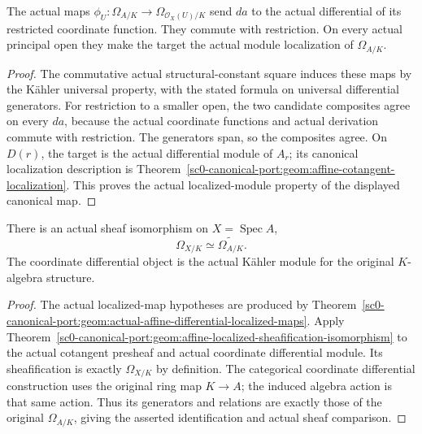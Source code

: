 \begin{theorem}
\label{sc0-canonical-port:geom:actual-affine-differential-localized-maps}
\leanok
The actual maps
\(\phi_U:\Omega_{A/K}\to\Omega_{\mathcal O_X(U)/K}\)
send \(da\) to the actual differential of its restricted
coordinate function. They commute with restriction.
On every actual principal open they make the target
the actual module localization of \(\Omega_{A/K}\).
\end{theorem}
\begin{proof}
The commutative actual structural-constant square induces
these maps by the Kähler universal property, with the
stated formula on universal differential generators.
For restriction to a smaller open, the two candidate
composites agree on every \(da\), because the actual
coordinate functions and actual derivation commute
with restriction. The generators span, so the composites
agree. On \(D(r)\), the target is the actual
differential module of \(A_r\); its canonical
localization description is
Theorem~\ref{sc0-canonical-port:geom:affine-cotangent-localization}.
This proves the actual localized-module property
of the displayed canonical map.
\end{proof}

\begin{theorem}
\label{sc0-canonical-port:geom:actual-affine-cotangent-sheaf-comparison}
\leanok
There is an actual sheaf isomorphism on
\(X=\operatorname{Spec}A\),
\[
 \Omega_{X/K}\simeq\widetilde{\Omega_{A/K}}.
\]
The coordinate differential object is the actual
Kähler module for the original \(K\)-algebra structure.
\end{theorem}
\begin{proof}
The actual localized-map hypotheses are produced by
Theorem~\ref{sc0-canonical-port:geom:actual-affine-differential-localized-maps}.
Apply Theorem~\ref{sc0-canonical-port:geom:affine-localized-sheafification-isomorphism}
to the actual cotangent presheaf and actual coordinate
differential module. Its sheafification is exactly
\(\Omega_{X/K}\) by definition. The categorical
coordinate differential construction uses the original
ring map \(K\to A\); the induced algebra action is
that same action. Thus its generators and relations
are exactly those of the original \(\Omega_{A/K}\),
giving the asserted identification and actual sheaf
comparison.
\end{proof}


